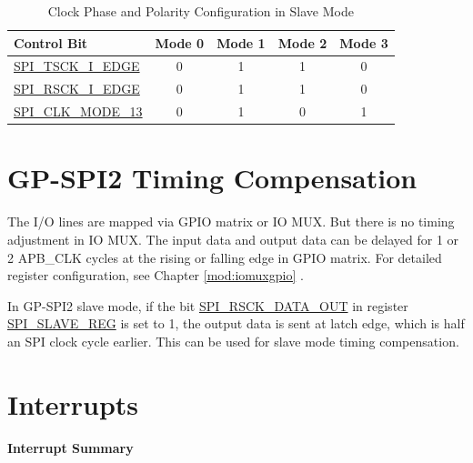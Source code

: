 \documentclass[main\_\_EN.tex]{subfiles}
\begin{document}
\begin{table}[H]
    \centering
    \caption{Clock Phase and Polarity Configuration in Slave Mode}
    \label{table:clock_pol_slave}
    \begin{tabular}[c]{|p{3.5cm}|c|c|c|c|}
    \hline
    \rowcolor{lightgray}
    \textbf{Control Bit} & \textbf{Mode 0} & \textbf{Mode 1} & \textbf{Mode 2} & \textbf{Mode 3}\\
    \hline
    \hyperref[fielddesc:SPITSCKIEDGE]{SPI\_TSCK\_I\_EDGE}   & 0 & 1 & 1 & 0\\
    \hline
    \hyperref[fielddesc:SPIRSCKIEDGE]{SPI\_RSCK\_I\_EDGE}   & 0 & 1 & 1 & 0\\
    \hline
    \hyperref[fielddesc:SPICLKMODE13]{SPI\_CLK\_MODE\_13}     & 0 & 1 & 0 & 1\\
    \hline
    \end{tabular}
\end{table}


\section{GP-SPI2 Timing Compensation} \label{sec:gp-spi-timing-compensation}


The I/O lines are mapped via GPIO matrix or IO MUX. But there is no timing adjustment in IO MUX. The input data and output data can be delayed for 1 or 2 APB\_CLK cycles at the rising or falling edge in GPIO matrix. For detailed register configuration, see Chapter \ref{mod:iomuxgpio} \textit{}.

















In GP-SPI2 slave mode, if the bit \hyperref[fielddesc:SPIRSCKDATAOUT]{SPI\_RSCK\_DATA\_OUT} in register \hyperref[regdesc:SPISLAVEREG]{SPI\_SLAVE\_REG} is set to 1, the output data is sent at latch edge, which is half an SPI clock cycle earlier. This can be used for slave mode timing compensation.


\section{Interrupts} \label{sec:spi-interrupt}

\textbf{Interrupt Summary}
\end{document}
